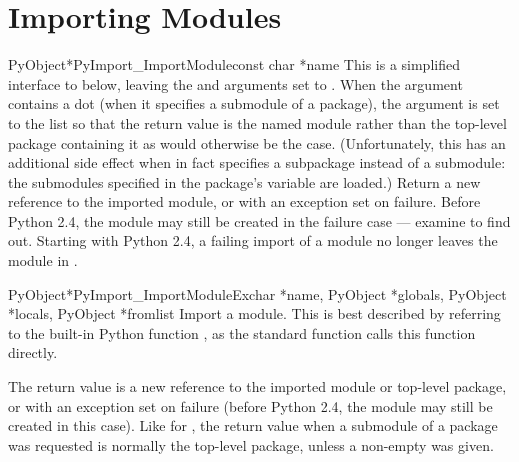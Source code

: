 \section{Importing Modules \label{importing}}

\begin{cfuncdesc}{PyObject*}{PyImport_ImportModule}{const char *name}
  This is a simplified interface to
   below, leaving the
   and  arguments set to \NULL.  When the
   argument contains a dot (when it specifies a submodule of
  a package), the  argument is set to the list
  \code{['*']} so that the return value is the named module rather
  than the top-level package containing it as would otherwise be the
  case.  (Unfortunately, this has an additional side effect when
   in fact specifies a subpackage instead of a submodule:
  the submodules specified in the package's  variable
  are 
  loaded.)  Return
  a new reference to the imported module, or \NULL{} with an exception
  set on failure.  Before Python 2.4, the module may still be created in
  the failure case --- examine  to find out.  Starting
  with Python 2.4, a failing import of a module no longer leaves the
  module in .
\end{cfuncdesc}

\begin{cfuncdesc}{PyObject*}{PyImport_ImportModuleEx}{char *name,
                       PyObject *globals, PyObject *locals, PyObject *fromlist}
  Import a module.  This is best described by referring to the
  built-in Python function
  , as the standard
   function calls this function directly.

  The return value is a new reference to the imported module or
  top-level package, or \NULL{} with an exception set on failure (before
  Python 2.4, the
  module may still be created in this case).  Like for
  , the return value when a submodule of a
  package was requested is normally the top-level package, unless a
  non-empty  was given.
\end{cfuncdesc}

